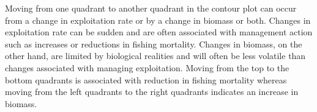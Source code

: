 

Moving from one quadrant to another quadrant in the contour plot can occur from a change in exploitation rate or by a change in biomass or both. Changes in exploitation rate can be sudden and are often associated with management action such as increases or reductions in fishing mortality. Changes in biomass, on the other hand, are limited by biological realities and will often be less volatile than changes associated with managing exploitation. Moving from the top to the bottom quadrants is associated with reduction in fishing mortality whereas moving from the left quadrants to the right quadrants indicates an increase in biomass. 
